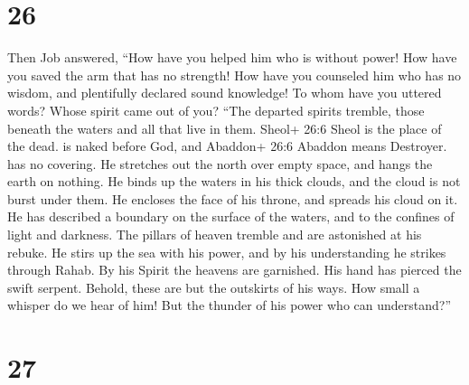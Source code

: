 \hypertarget{section-15}{%
\section{26}\label{section-15}}

 Then Job answered,  ``How have you helped him
who is without power! How have you saved the arm that has no strength!
 How have you counseled him who has no wisdom, and
plentifully declared sound knowledge!  To whom have you
uttered words? Whose spirit came out of you?  ``The departed
spirits tremble, those beneath the waters and all that live in them.
 Sheol+ 26:6 Sheol is the place of the dead. is naked before
God, and Abaddon+ 26:6 Abaddon means Destroyer. has no covering.
 He stretches out the north over empty space, and hangs the
earth on nothing.  He binds up the waters in his thick
clouds, and the cloud is not burst under them.  He encloses
the face of his throne, and spreads his cloud on it.  He
has described a boundary on the surface of the waters, and to the
confines of light and darkness.  The pillars of heaven
tremble and are astonished at his rebuke.  He stirs up the
sea with his power, and by his understanding he strikes through Rahab.
 By his Spirit the heavens are garnished. His hand has
pierced the swift serpent.  Behold, these are but the
outskirts of his ways. How small a whisper do we hear of him! But the
thunder of his power who can understand?''

\hypertarget{section-16}{%
\section{27}\label{section-16}}

